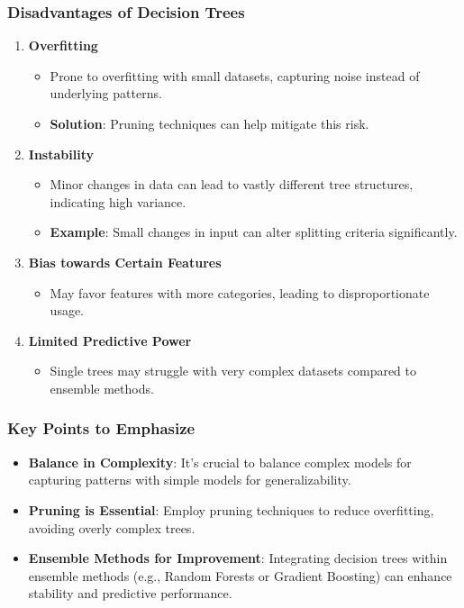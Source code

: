 \documentclass[aspectratio=169]{beamer}
\begin{document}
\begin{frame}[fragile]
    \frametitle{Disadvantages of Decision Trees}
    \begin{enumerate}
        \item \textbf{Overfitting}
            \begin{itemize}
                \item Prone to overfitting with small datasets, capturing noise instead of underlying patterns.
                \item \textbf{Solution}: Pruning techniques can help mitigate this risk.
            \end{itemize}
        
        \item \textbf{Instability}
            \begin{itemize}
                \item Minor changes in data can lead to vastly different tree structures, indicating high variance.
                \item \textbf{Example}: Small changes in input can alter splitting criteria significantly.
            \end{itemize}
        
        \item \textbf{Bias towards Certain Features}
            \begin{itemize}
                \item May favor features with more categories, leading to disproportionate usage.
            \end{itemize}
        
        \item \textbf{Limited Predictive Power}
            \begin{itemize}
                \item Single trees may struggle with very complex datasets compared to ensemble methods.
            \end{itemize}
    \end{enumerate}
\end{frame}

\begin{frame}[fragile]
    \frametitle{Key Points to Emphasize}
    \begin{itemize}
        \item \textbf{Balance in Complexity}: It's crucial to balance complex models for capturing patterns with simple models for generalizability.
        \item \textbf{Pruning is Essential}: Employ pruning techniques to reduce overfitting, avoiding overly complex trees.
        \item \textbf{Ensemble Methods for Improvement}: Integrating decision trees within ensemble methods (e.g., Random Forests or Gradient Boosting) can enhance stability and predictive performance.
    \end{itemize}
\end{frame}
\end{document}
